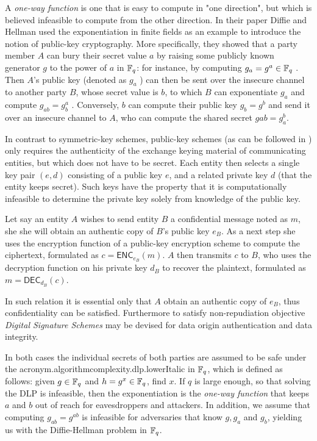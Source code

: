 A \textit{one-way function} is one that is easy to compute in "one direction", but which is
believed infeasible to compute from the other direction. In their paper Diffie and Hellman used the 
exponentiation in finite fields as an example to introduce the notion of public-key cryptography.  More specifically, they showed that a party member $A$ can bury their secret value $a$ by raising some publicly known generator $g$ to the power of $a$ in $\mathbb{F}_q$:  for instance, by computing $g_a = g^a \in \mathbb{F}_q$ . Then $A$'s public key  (denoted as $g_a$ ) can then be sent over the insecure channel to another party $B$, whose secret value is $b$, to which $B$ can exponentiate $g_a$ and compute $g_{ab} = g^a_b$ . Conversely, $b$ can compute their public key $g_b = g^b$ and send it over an insecure channel to $A$, who can compute the shared secret $gab = g^b_a$.

In contrast to symmetric-key schemes, public-key schemes (as can be followed in ) only requires the authenticity of the exchange keying material of communicating entities, but which does not have to be secret. Each entity then selects a single key pair $(e, d)$ consisting of a public key $e$, and a related private key $d$ (that the entity keeps secret). Such keys have the property that it is computationally infeasible to determine the private key solely from knowledge of the public key. 

Let say an entity $A$ wishes to send entity $B$ a confidential message noted as $m$, she she will obtain an authentic copy of $B$’s public key $e_B$. As a next step she uses the encryption function of a public-key encryption scheme to compute the ciphertext, formulated as $c = \mathsf{ENC}_{e_B}(m)$. $A$ then transmits $c$ to $B$, who uses the decryption function on his private key $d_B$ to recover the plaintext, formulated as $m= \mathsf{DEC}_{d_B}(c)$. 

In such relation it is essential only that $A$ obtain an authentic copy of $e_B$, thus confidentiality can be satisfied.  Furthermore to satisfy non-repudiation objective \textit{Digital Signature Schemes} may be devised for data origin authentication and data integrity. 

In both  cases the individual secrets of both parties are assumed to be safe under the  \ac{acronym.algorithmcomplexity.dlp.lowerItalic} in $\mathbb{F}_q$, which is
defined as follows: given $g \in \mathbb{F}_q$ and $h = g^x \in \mathbb{F}_q$, find $x$.  If $q$ is large enough, so that solving the DLP is infeasible, then the exponentiation is the \textit{one-way function} that keeps $a$ and $b$ out of reach for eavesdroppers and attackers. In addition, we assume that computing $g_{ab} = g^{ab}$ is infeasible for adversaries that know $g, g_a$ and $g_b$,  yielding us with the Diffie-Hellman problem in $\mathbb{F}_q$. \cite{costello.fast.formulas.thesis, BF01}


